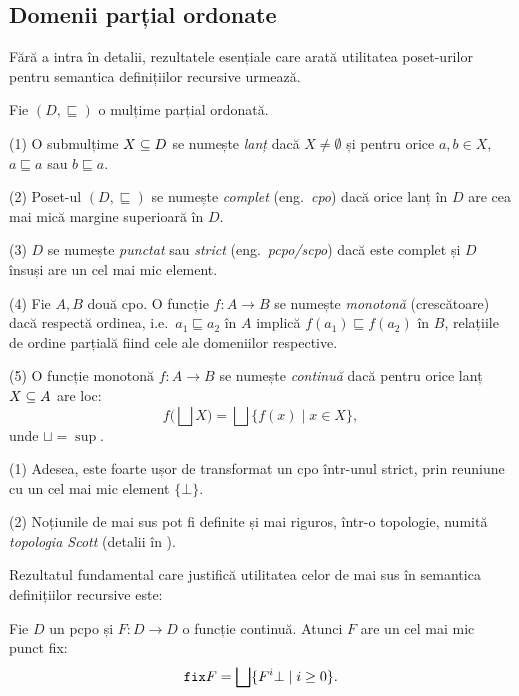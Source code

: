 \documentclass[12pt, a4paper]{article}
\begin{document}

\subsection{Domenii parțial ordonate}

\indent\indent Fără a intra în detalii, rezultatele esențiale care arată utilitatea
poset-urilor pentru semantica definițiilor recursive urmează.

\begin{definition}\label{def:cpo}
  Fie $ (D, \sqsubseteq) $ o mulțime parțial ordonată.

  (1) O submulțime $ X \subseteq D $ se numește \emph{lanț} dacă $ X \neq \emptyset $ și
  pentru orice $ a, b \in X $, $ a \sqsubseteq a $ sau $ b \sqsubseteq a $.

  (2) Poset-ul $ (D, \sqsubseteq) $ se numește \emph{complet} (eng.\ \emph{cpo}) dacă
  orice lanț în $ D $ are cea mai mică margine superioară în $ D $.

  (3) $ D $ se numește \emph{punctat} sau \emph{strict} (eng.\ \emph{pcpo/scpo}) dacă
  este complet și $ D $ însuși are un cel mai mic element.

  (4) Fie $ A, B $ două cpo. O funcție $ f : A \to B $ se numește \emph{monotonă}
  (crescătoare) dacă respectă ordinea, i.e.\ $ a_1 \sqsubseteq a_2 $ în $ A $ implică
  $ f(a_1) \sqsubseteq f(a_2) $ în $ B $, relațiile de ordine parțială fiind cele
  ale domeniilor respective.

  (5) O funcție monotonă $ f : A \to B $ se numește \emph{continuă} dacă pentru orice
  lanț $ X \subseteq A $ are loc:
  \[
    f \Big( \bigsqcup X \Big) = \bigsqcup \{ f(x) \mid x \in X \},
  \]
  unde $ \sqcup = \sup $.
\end{definition}

\begin{remark}\label{rk:top}
  (1) Adesea, este foarte ușor de transformat un cpo într-unul strict, prin reuniune
  cu un cel mai mic element $ \{ \bot \} $.

  (2) Noțiunile de mai sus pot fi definite și mai riguros, într-o topologie, numită
  \emph{topologia Scott} (detalii în \cite{abrj}).
\end{remark}

Rezultatul fundamental care justifică utilitatea celor de mai sus în semantica definițiilor
recursive este:

\begin{theorem}\label{thm:fix}
  Fie $ D $ un pcpo și $ F : D \to D $ o funcție continuă. Atunci $ F $ are un cel mai
  mic punct fix:
  \[
    \texttt{fix} F = \bigsqcup \{ F^i \bot \mid i \geq 0 \}.
  \]
\end{theorem}
\end{document}
